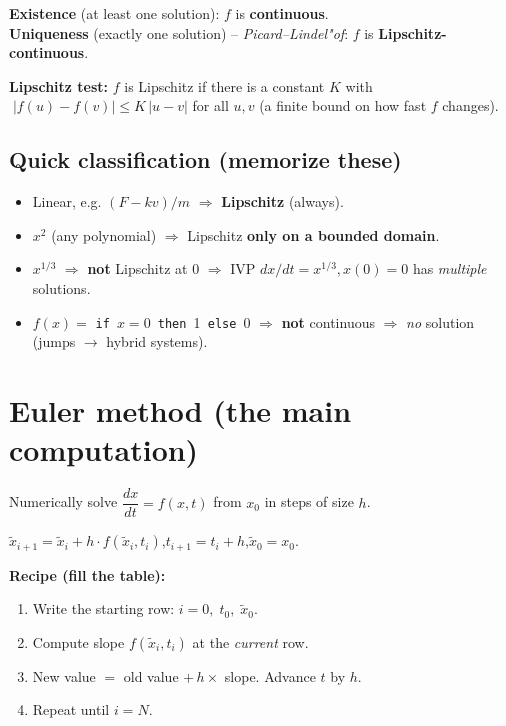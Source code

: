 \begin{keybox}
\textbf{Existence} (at least one solution): $f$ is \textbf{continuous}.\\
\textbf{Uniqueness} (exactly one solution) -- \emph{Picard--Lindel"of}: $f$ is \textbf{Lipschitz-continuous}.
\end{keybox}

\textbf{Lipschitz test:} $f$ is Lipschitz if there is a constant $K$ with
$\;|f(u)-f(v)|\le K\,|u-v|$ for all $u,v$ (a finite bound on how fast $f$ changes).

\subsection*{Quick classification (memorize these)}
\begin{itemize}
\item Linear, e.g. $(F-kv)/m$ \;$\Rightarrow$\; \textbf{Lipschitz} (always).
\item $x^2$ (any polynomial) \;$\Rightarrow$\; Lipschitz \textbf{only on a bounded domain}.
\item $x^{1/3}$ \;$\Rightarrow$\; \textbf{not} Lipschitz at $0$ $\Rightarrow$ IVP $dx/dt=x^{1/3},x(0)=0$ has \emph{multiple} solutions.
\item $f(x)=$ \texttt{if }$x=0$\texttt{ then }1\texttt{ else }0 \;$\Rightarrow$\; \textbf{not} continuous $\Rightarrow$ \emph{no} solution (jumps $\to$ hybrid systems).
\end{itemize}

\section{Euler method (the main computation)}
Numerically solve $\dfrac{dx}{dt}=f(x,t)$ from $x_0$ in steps of size $h$.

\begin{keybox}
\centering $\tilde x_{i+1}=\tilde x_i+h\cdot f(\tilde x_i,t_i)$,\qquad $t_{i+1}=t_i+h$,\qquad $\tilde x_0=x_0$.
\end{keybox}

\textbf{Recipe (fill the table):}
\begin{enumerate}
\item Write the starting row: $i=0,\;t_0,\;\tilde x_0$.
\item Compute slope $f(\tilde x_i,t_i)$ at the \emph{current} row.
\item New value $=$ old value $+\,h\times$ slope. Advance $t$ by $h$.
\item Repeat until $i=N$.
\end{enumerate}

